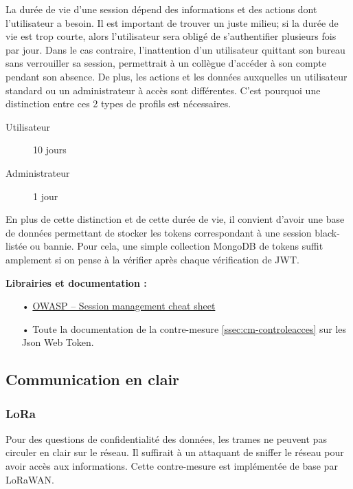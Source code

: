 \documentclass[12pt]{article}
\begin{document}
La durée de vie d'une session dépend des informations et des actions dont l'utilisateur a besoin. Il est important de trouver un juste milieu; si la durée de vie est trop courte, alors l'utilisateur sera obligé de s'authentifier plusieurs fois par jour. Dans le cas contraire, l'inattention d'un utilisateur quittant son bureau sans verrouiller sa session, permettrait à un collègue d'accéder à son compte pendant son absence. De plus, les actions et les données auxquelles un utilisateur standard ou un administrateur à accès sont différentes. C'est pourquoi une distinction entre ces 2 types de profils est nécessaires.

\begin{description}
\item[Utilisateur] 10 jours
\item[Administrateur] 1 jour
\end{description}

En plus de cette distinction et de cette durée de vie, il convient d'avoir une base de données permettant de stocker les tokens correspondant à une session black-listée ou bannie. Pour cela, une simple collection MongoDB de tokens suffit amplement si on pense à la vérifier après chaque vérification de JWT.

\medskip
\textbf{Librairies et documentation :}

\begin{itemize}
\item[•] \href{https://www.owasp.org/index.php/Session_Management_Cheat_Sheet#Session_ID_Life_Cycle}{OWASP -- Session management cheat sheet}
\item[•] Toute la documentation de la contre-mesure \ref{ssec:cm-controleacces} sur les Json Web Token.
\end{itemize}

\subsection{Communication en clair}
\label{ssec:cm-tls}

\subsubsection{LoRa}

Pour des questions de confidentialité des données, les trames ne peuvent pas circuler en clair sur le réseau. Il suffirait à un attaquant de sniffer le réseau pour avoir accès aux informations. Cette contre-mesure est implémentée de base par LoRaWAN.
\end{document}
